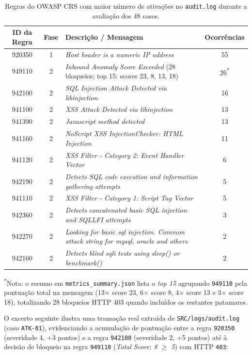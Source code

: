\documentclass[11pt,a4paper]{article}
\begin{document}
\begin{table}[h!]
\centering
\caption{Regras do OWASP CRS com maior número de ativações no \texttt{audit.log} durante a avaliação dos 48 casos.}
\label{tab:top_regras_crs}
\begin{tabularx}{\textwidth}{c c X c}
\toprule
\textbf{ID da Regra} & \textbf{Fase} & \textbf{Descrição / Mensagem} & \textbf{Ocorrências} \\
\midrule
920350 & 1 & \textit{Host header is a numeric IP address} & 55 \\
949110 & 2 & \textit{Inbound Anomaly Score Exceeded} (28 bloqueios; top 15: scores 23, 8, 13, 18) & 26\textsuperscript{*} \\
942100 & 2 & \textit{SQL Injection Attack Detected via libinjection} & 16 \\
941100 & 2 & \textit{XSS Attack Detected via libinjection} & 13 \\
941390 & 2 & \textit{Javascript method detected} & 13 \\
941160 & 2 & \textit{NoScript XSS InjectionChecker: HTML Injection} & 11 \\
941120 & 2 & \textit{XSS Filter - Category 2: Event Handler Vector} & 6 \\
942190 & 2 & \textit{Detects SQL code execution and information gathering attempts} & 5 \\
941110 & 2 & \textit{XSS Filter - Category 1: Script Tag Vector} & 5 \\
942360 & 2 & \textit{Detects concatenated basic SQL injection and SQLLFI attempts} & 3 \\
942270 & 2 & \textit{Looking for basic sql injection. Common attack string for mysql, oracle and others} & 2 \\
942160 & 2 & \textit{Detects blind sqli tests using sleep() or benchmark()} & 2 \\
\bottomrule
\end{tabularx}
\par\vspace{0.15cm}\footnotesize\textsuperscript{*}Nota: o resumo em \texttt{metrics\_summary.json} lista o \textit{top 15} agrupando \texttt{949110} pela pontuação total na mensagem (13$\times$ score 23, 6$\times$ score 8, 4$\times$ score 13 e 3$\times$ score 18), totalizando 28 bloqueios HTTP 403 quando incluídos os restantes patamares.
\end{table}

\newpage
O excerto seguinte ilustra uma transação real extraída de \texttt{SRC/logs/audit.log} (caso \texttt{ATK-01}), evidenciando a acumulação de pontuação entre a regra \texttt{920350} (severidade 4, +3 pontos) e a regra \texttt{942100} (severidade 2, +5 pontos) até à decisão de bloqueio na regra \texttt{949110} (\textit{Total Score: 8 $\geq$ 5}) com HTTP \texttt{403}:
\end{document}
